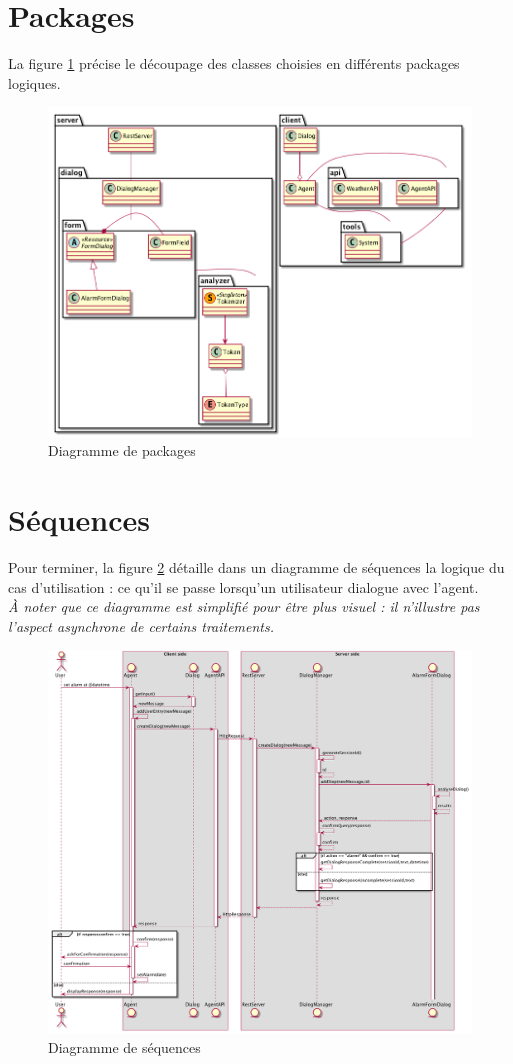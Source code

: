\section{Packages}

La figure \ref{package-diagram} précise le découpage des classes choisies en différents packages logiques.

\begin{figure}[!h]
    \centering
    \includegraphics[width=1.1\textwidth,center]{../docs/conception/build/packageDiagram.png}
    \caption{Diagramme de packages}
    \label{package-diagram}
\end{figure}


\section{Séquences}

Pour terminer, la figure \ref{sequence-diagram} détaille dans un diagramme de séquences la logique du cas d'utilisation :
ce qu'il se passe lorsqu'un utilisateur dialogue avec l'agent.\\
\textit{À noter que ce diagramme est simplifié pour être plus
visuel : il n'illustre pas l'aspect asynchrone de certains traitements.}


\begin{figure}[!h]
    \centering
    \includegraphics[width=1.3\textwidth,center]{../docs/conception/build/sequenceDiagram.png}
    \caption{Diagramme de séquences}
    \label{sequence-diagram}
\end{figure}

